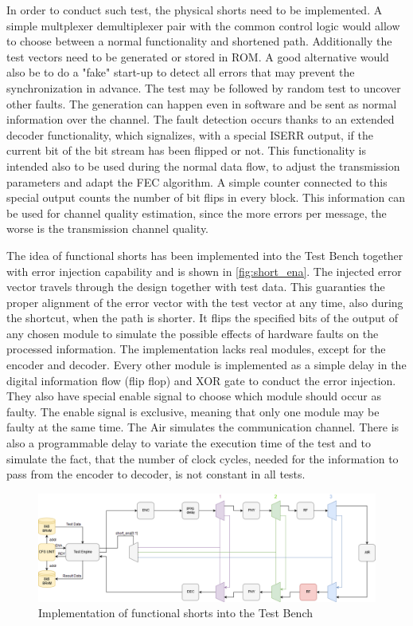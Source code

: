In order to conduct such test, the physical shorts need to be implemented. A simple multplexer demultiplexer pair with the common control logic would allow to choose between a normal functionality and shortened path. Additionally the test vectors need to be generated or stored in ROM. A good alternative would also be to do a "fake" start-up to detect all errors that may prevent the synchronization in advance. The test may be followed by random test to uncover other faults. The generation can happen even in software and be sent as normal information over the channel. The fault detection occurs thanks to an extended decoder functionality, which signalizes, with a special ISERR output, if the current bit of the bit stream has been flipped or not. This functionality is intended also to be used during the normal data flow, to adjust the transmission parameters and adapt the FEC algorithm. A simple counter connected to this special output counts the number of bit flips in every block. This information can be used for channel quality estimation, since the more errors per message, the worse is the transmission channel quality. 

The idea of functional shorts has been implemented into the Test Bench together with error injection capability and is shown in \autoref{fig:short_ena}. The injected error vector travels through the design together with test data. This guaranties the proper alignment of the error vector with the test vector at any time, also during the shortcut, when the path is shorter. It flips the specified bits of the output of any chosen module to simulate the possible effects of hardware faults on the processed information. The implementation lacks real modules, except for the encoder and decoder. Every other module is implemented as a simple delay in the digital information flow (flip flop) and XOR gate to conduct the error injection. They also have special enable signal to choose which module should occur as faulty. The enable signal is exclusive, meaning that only one module may be faulty at the same time. The Air simulates the communication channel. There is also a programmable delay to variate the execution time of the test and to simulate the fact, that the number of clock cycles, needed for the information to pass from the encoder to decoder, is not constant in all tests.

\begin{figure}[h]
\centering
\includegraphics[width=\textwidth]{figures/Short_ena_err.png}
\caption{Implementation of functional shorts into the Test Bench}
\label{fig:short_ena}
\end{figure}

